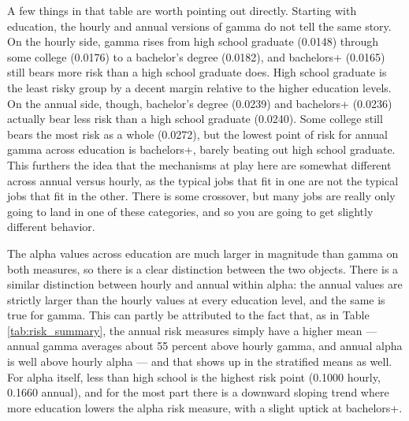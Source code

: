 \documentclass[12pt]{article}
\begin{document}
\begin{onehalfspace}
\begin{table}[H]
    \centering
    \caption{Stratified Means of Gamma and Alpha by Demographic Group}
    \label{tab:stratified_means_gamma_alpha}
    \resizebox{0.9\textwidth}{!}{%
        
    }
\end{table}


A few things in that table are worth pointing out directly. Starting with education, the hourly and annual versions of gamma do not tell the same story. On the hourly side, gamma rises from high school graduate (0.0148) through some college (0.0176) to a bachelor's degree (0.0182), and bachelors+ (0.0165) still bears more risk than a high school graduate does. High school graduate is the least risky group by a decent margin relative to the higher education levels. On the annual side, though, bachelor's degree (0.0239) and bachelors+ (0.0236) actually bear less risk than a high school graduate (0.0240). Some college still bears the most risk as a whole (0.0272), but the lowest point of risk for annual gamma across education is bachelors+, barely beating out high school graduate. This furthers the idea that the mechanisms at play here are somewhat different across annual versus hourly, as the typical jobs that fit in one are not the typical jobs that fit in the other. There is some crossover, but many jobs are really only going to land in one of these categories, and so you are going to get slightly different behavior.

The alpha values across education are much larger in magnitude than gamma on both measures, so there is a clear distinction between the two objects. There is a similar distinction between hourly and annual within alpha: the annual values are strictly larger than the hourly values at every education level, and the same is true for gamma. This can partly be attributed to the fact that, as in Table \ref{tab:risk_summary}, the annual risk measures simply have a higher mean --- annual gamma averages about 55 percent above hourly gamma, and annual alpha is well above hourly alpha --- and that shows up in the stratified means as well. For alpha itself, less than high school is the highest risk point (0.1000 hourly, 0.1660 annual), and for the most part there is a downward sloping trend where more education lowers the alpha risk measure, with a slight uptick at bachelors+.


\end{onehalfspace}
\end{document}
